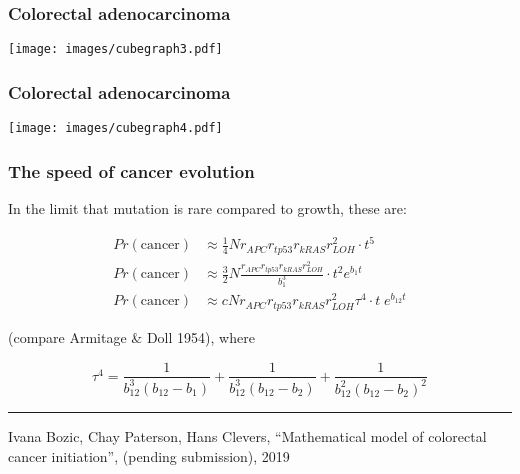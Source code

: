 \documentclass{beamer}
\begin{document}
\begin{frame}
    \frametitle{Colorectal adenocarcinoma}

    \begin{center}
    \texttt{[image: images/cubegraph3.pdf]}
    \end{center}

\end{frame}

\begin{frame}
    \frametitle{Colorectal adenocarcinoma}

    \begin{center}
    \texttt{[image: images/cubegraph4.pdf]}
    \end{center}

\end{frame}


\begin{frame}
    \frametitle{The speed of cancer evolution}
    In the limit that mutation is rare compared to growth, these are:

    \begin{align}
        Pr(\mathrm{cancer}) &\approx \frac{1}{4} N r_{APC} r_{tp53} r_{kRAS} r_{LOH}^2 \cdot t^5 \\
        Pr(\mathrm{cancer}) &\approx \frac{3}{2} N \frac{r_{APC} r_{tp53} r_{kRAS} r_{LOH}^2}{b_1^3}
        \cdot t^2 e^{b_1 t} \\
        Pr(\mathrm{cancer}) &\approx c N r_{APC} r_{tp53} r_{kRAS} r_{LOH}^2 \tau^4 \cdot t\; e^{b_{12} t}
    \end{align}

    (compare Armitage \& Doll 1954), where

    \begin{equation*}
        \tau^4 = \frac{1}{b_{12}^3 (b_{12}-b_1)} + \frac{1}{b_{12}^3 (b_{12}-b_2)} +
            \frac{1}{b_{12}^2 (b_{12}-b_2)^2}
    \end{equation*}

    \;
    \hrule
    \;

    \tiny{Ivana Bozic\*, Chay Paterson, Hans Clevers, ``Mathematical model of
    colorectal cancer initiation'', (pending submission), 2019}
\end{frame}
\end{document}
